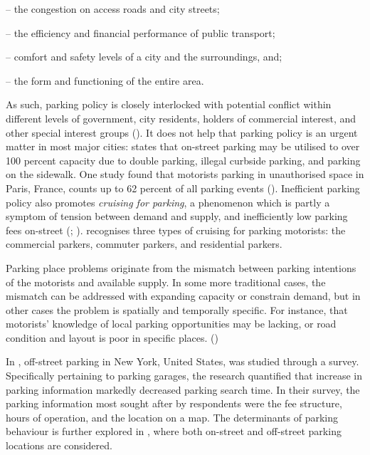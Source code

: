 \begin{itemize}
    \begin{singlespace}
        \item[--] the congestion on access roads and city streets;
        \item[--] the efficiency and financial performance of public transport;
        \item[--] comfort and safety levels of a city and the surroundings, and;
        \item[--] the form and functioning of the entire area.
    \end{singlespace}
\end{itemize}

As such, parking policy is closely interlocked with potential conflict within different levels of government, city residents, holders of commercial interest, and other special interest groups (\cite{Ker1988}). It does not help that parking policy is an urgent matter in most major cities:  states that on-street parking may be utilised to over 100 percent capacity due to double parking, illegal curbside parking, and parking on the sidewalk. One study found that motorists parking in unauthorised space in Paris, France, counts up to 62 percent of all parking events (\cite{Gantelet2006}). Inefficient parking policy also promotes \textit{cruising for parking}, a phenomenon which is partly a symptom of tension between demand and supply, and inefficiently low parking fees on-street (\cite{Shoup2004}; \citeyear{Shoup2006}).  recognises three types of cruising for parking motorists: the commercial parkers, commuter parkers, and residential parkers.

Parking place problems originate from the mismatch between parking intentions of the motorists and available supply. In some more traditional cases, the mismatch can be addressed with expanding capacity or constrain demand, but in other cases the problem is spatially and temporally specific. For instance, that motorists' knowledge of local parking opportunities may be lacking, or road condition and layout is poor in specific places. (\cite{Axhausen1993})

In , off-street parking in New York, United States, was studied through a survey. Specifically pertaining to parking garages, the research quantified that increase in parking information markedly decreased parking search time. In their survey, the parking information most sought after by respondents were the fee structure, hours of operation, and the location on a map. The determinants of parking behaviour is further explored in , where both on-street and off-street parking locations are considered.

